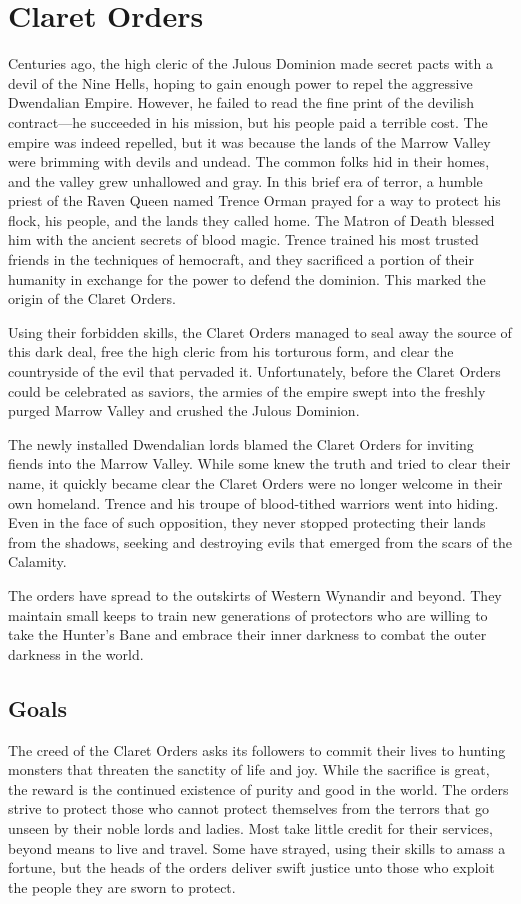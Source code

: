 \documentclass[10pt,a4paper,twoside,bg=print,twocolumn,openany,nodeprecatedcode]{dndbook}
\begin{document}
\section{Claret Orders}
Centuries ago, the high cleric of the Julous Dominion made secret pacts with a devil of the Nine Hells, hoping to gain enough power to repel the aggressive Dwendalian Empire. However, he failed to read the fine print of the devilish contract—he succeeded in his mission, but his people paid a terrible cost. The empire was indeed repelled, but it was because the lands of the Marrow Valley were brimming with devils and undead. The common folks hid in their homes, and the valley grew unhallowed and gray. In this brief era of terror, a humble priest of the Raven Queen named Trence Orman prayed for a way to protect his flock, his people, and the lands they called home. The Matron of Death blessed him with the ancient secrets of blood magic. Trence trained his most trusted friends in the techniques of hemocraft, and they sacrificed a portion of their humanity in exchange for the power to defend the dominion. This marked the origin of the Claret Orders.

Using their forbidden skills, the Claret Orders managed to seal away the source of this dark deal, free the high cleric from his torturous form, and clear the countryside of the evil that pervaded it. Unfortunately, before the Claret Orders could be celebrated as saviors, the armies of the empire swept into the freshly purged Marrow Valley and crushed the Julous Dominion.

The newly installed Dwendalian lords blamed the Claret Orders for inviting fiends into the Marrow Valley. While some knew the truth and tried to clear their name, it quickly became clear the Claret Orders were no longer welcome in their own homeland. Trence and his troupe of blood-tithed warriors went into hiding. Even in the face of such opposition, they never stopped protecting their lands from the shadows, seeking and destroying evils that emerged from the scars of the Calamity.

The orders have spread to the outskirts of Western Wynandir and beyond. They maintain small keeps to train new generations of protectors who are willing to take the Hunter's Bane and embrace their inner darkness to combat the outer darkness in the world.

\subsection{Goals}
The creed of the Claret Orders asks its followers to commit their lives to hunting monsters that threaten the sanctity of life and joy. While the sacrifice is great, the reward is the continued existence of purity and good in the world. The orders strive to protect those who cannot protect themselves from the terrors that go unseen by their noble lords and ladies. Most take little credit for their services, beyond means to live and travel. Some have strayed, using their skills to amass a fortune, but the heads of the orders deliver swift justice unto those who exploit the people they are sworn to protect.
\end{document}
